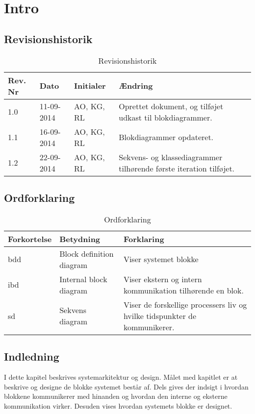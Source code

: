 \chapter{Intro}

\section{Revisionshistorik}
\begin{table}[H]
	\centering
		\begin{tabular}{|p{2 cm}|p{2 cm}|p{3 cm}|p{6 cm}|} 
		\hline
			\textbf{Rev. Nr} & \textbf{Dato}		& \textbf{Initialer} 	& \textbf{Ændring} \\ \hline
			1.0 	& 11-09-2014 & AO, KG, RL  & Oprettet dokument, og tilføjet udkast til blokdiagrammer.  \\ \hline
			1.1 	& 16-09-2014 & AO, KG, RL  & Blokdiagrammer opdateret. 	\\ \hline
			1.2 	& 22-09-2014 & AO, KG, RL  & Sekvens- og klassediagrammer tilhørende første iteration tilføjet.	\\ \hline
		\end{tabular}
	\caption{Revisionshistorik}
\end{table}

\vspace{1.5cm}

\section{Ordforklaring}
\begin{table}[H]
	\centering
		\begin{tabular}{|p{2.5cm}|p{4.5 cm}|p{6.5 cm}|} 
		\hline
			\textbf{Forkortelse} & \textbf{Betydning} & \textbf{Forklaring} \\ \hline
			 bdd& Block definition diagram  & Viser systemet blokke  \\ \hline
			 ibd& Internal block diagram & Viser ekstern og intern kommunikation tilhørende en blok. \\ \hline
			 sd& Sekvens diagram & Viser de forskellige processers liv og hvilke tidspunkter de kommunikerer. \\ \hline
		\end{tabular}
	\caption{Ordforklaring}
\end{table}

\vspace{2cm}

\section{Indledning}
I dette kapitel beskrives systemarkitektur og design. Målet med kapitlet er at beskrive og designe de blokke systemet består af. Dels gives der indsigt i hvordan blokkene kommunikerer med hinanden og hvordan den interne og eksterne kommunikation virker. Desuden vises hvordan systemets blokke er designet. 
